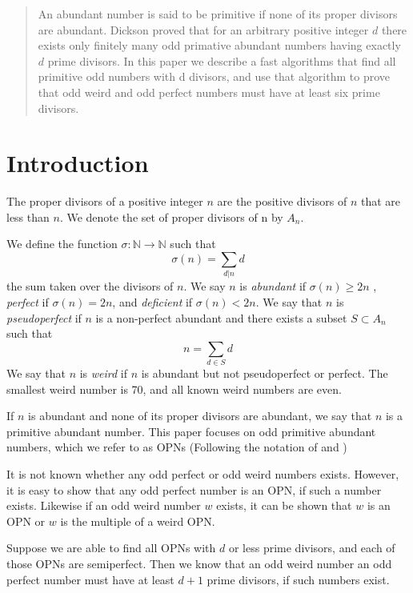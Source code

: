 \documentclass[../paper.tex]{article}
\begin{document}
\begin{abstract}
An abundant number is said to be primitive if none of its proper 
divisors are abundant.  Dickson proved that for an arbitrary
positive integer $d$ there exists only finitely many odd primative
abundant numbers having exactly $d$ prime divisors\cite{dickson}.
In this paper we describe a fast algorithms
that find all primitive odd numbers with d divisors, and use that
algorithm to prove that odd weird and odd perfect numbers must
have at least six prime divisors.
\end{abstract}

\section{Introduction}
The proper divisors of a positive integer $n$ are the positive
divisors of $n$ that are less than $n$. We denote the set of 
proper divisors of n by $\textit{A}_{n}$.

We define the function 
%
$\sigma: \mathbb{N} \rightarrow \mathbb{N}$
%
such that
%
$$\sigma(n) = \sum_{d|n}d$$
%
the sum taken over the divisors of $n$. We say $n$ is 
\textit{abundant} if $\sigma(n) \geq 2n$ \footnotemark
, \textit{perfect} if $\sigma(n) = 2n$, and \textit{deficient} if 
$\sigma(n) < 2n$. We say that $n$ is \textit{pseudoperfect} if 
$n$ is a non-perfect abundant and there exists a subset $ S 
\subset \textit{A}_{n}$ such that
%
%
%
$$ n = \sum_{d \in S} d$$
%
We say that $n$ is \textit{weird} if $n$ is abundant but not 
pseudoperfect or perfect. The smallest weird number is 70, and 
all known weird numbers are even.

If $n$ is abundant and none of its proper divisors are abundant,
we say that $n$ is a primitive abundant number. This paper focuses
on odd primitive abundant numbers, which we refer to as OPNs
(Following the notation of \cite{valdas} and \cite{amato})

It is not known whether any odd perfect or odd weird numbers
exists. However, it is easy to show that any odd perfect number is
an OPN, if such a number exists. Likewise if an odd weird number
$w$ exists, it can be shown that $w$ is an OPN or $w$ is the
multiple of a weird OPN.

Suppose we are able to find all OPNs with $d$ or less prime divisors, 
and each of those OPNs are semiperfect. Then we know that an odd 
weird number an odd perfect number must have at least $d + 1$ prime 
divisors, if such numbers exist.
\end{document}

